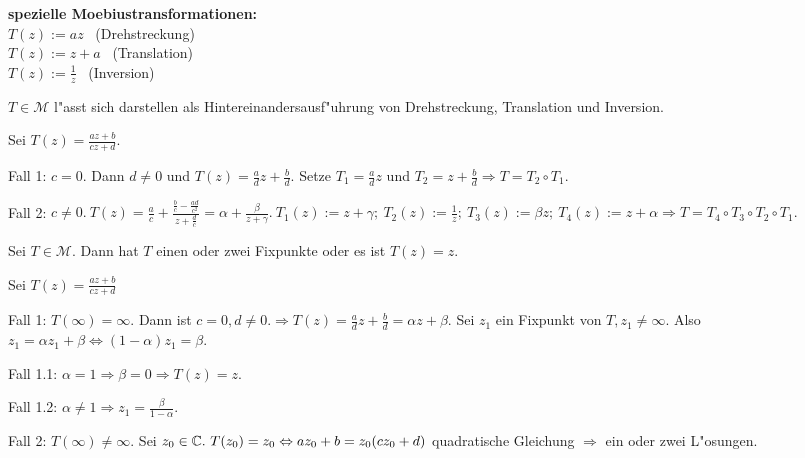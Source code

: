 \documentclass{article}
\begin{document}
{\bf spezielle Moebiustransformationen:}\\
$T(z) := az$ \ (Drehstreckung)\\
$T(z) := z+a$ \ (Translation)\\
$T(z) := \frac1z$ \ (Inversion)

\begin{satz}
$T \in \mathcal{M}$ l"asst sich darstellen als Hintereinandersausf"uhrung von Drehstreckung, Translation und Inversion.
\end{satz}

\begin{beweis}
Sei $T(z) = \frac{az+b}{cz+d}.$
\begin{liste}
\item[Fall 1:] $c=0$. Dann $d \not= 0$ und $T(z) = \frac{a}{d}z + \frac{b}{d}$. Setze $T_1=\frac{a}{d}z$ und $T_2=z+ \frac{b}{d} \Rightarrow T = T_2 \circ T_1.$
\item[Fall 2:] $c \not= 0.\ T(z) = \frac{a}{c}+\frac{\frac{b}{c}-\frac{ad}{c^2}}{z+\frac{d}{c}} = \alpha + \frac{\beta}{z+ \gamma}.\ T_1(z) := z+ \gamma;\ T_2(z) := \frac1z;\ T_3(z) := \beta z;\ T_4(z):=z + \alpha \Rightarrow T=T_4 \circ T_3 \circ T_2 \circ T_1.$
\end{liste}
\end{beweis}

\begin{satz}
Sei $T \in \mathcal{M}$. Dann hat $T$ einen oder zwei Fixpunkte oder es ist $T(z) = z$.
\end{satz}

\begin{beweis}
Sei $T(z) = \frac{az+b}{cz+d}$
\begin{liste}
\item[Fall 1:] $T(\infty) = \infty.$ Dann ist $c = 0, d \not= 0. \Rightarrow T(z) = \frac{a}{d}z + \frac{b}{d} = \alpha z + \beta.$ Sei $z_1$ ein Fixpunkt von $T, z_1 \not= \infty$. Also $z_1 = \alpha z_1 + \beta \Leftrightarrow (1-\alpha)z_1=\beta.$
\begin{liste}
\item[Fall 1.1:] $\alpha = 1 \Rightarrow \beta = 0 \Rightarrow T(z) = z$.
\item[Fall 1.2:] $\alpha \not=1 \Rightarrow z_1 = \frac{\beta}{1-\alpha}.$
\end{liste}
\item[Fall 2:] $T(\infty) \not= \infty$. Sei $z_0 \in \mathbb{C}.\ T(z_0) = z_0 \Leftrightarrow az_0+b = z_0(cz_0+d)$ quadratische Gleichung $\Rightarrow$ ein oder zwei L"osungen.
\end{liste}
\end{beweis}
\end{document}
